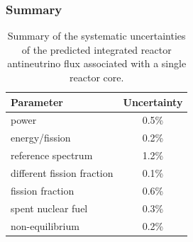\subsubsection{Summary}

\begin{table}[!htbp]
    \caption{Summary of the systematic uncertainties of the predicted integrated reactor antineutrino flux associated with a single reactor core.}
    \label{tab:reactorErr}
    \centering
    \footnotesize%
    \setlength{\tabcolsep}{4pt}%
    \renewcommand{\arraystretch}{1.2}%
    \begin{tabular}{lc}
        \hline
        Parameter & Uncertainty \\ 
        \hline
        power & 0.5\% \\
        energy/fission & 0.2\% \\
        reference spectrum & 1.2\% \\
        different fission fraction & 0.1\% \\
        fission fraction & 0.6\% \\
        spent nuclear fuel & 0.3\% \\
        non-equilibrium & 0.2\% \\
        \hline 
    \end{tabular}
\end{table}

